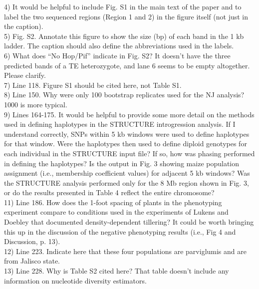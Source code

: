 \documentclass[]{article}
\begin{document}
4) It would be helpful to include Fig. S1 in the main text of the paper and to label the two sequenced regions (Region 1 and 2) in the figure itself (not just in the caption). \\

5) Fig. S2. Annotate this figure to show the size (bp) of each band in the 1 kb ladder. The caption should also define the abbreviations used in the labels. \\

6) What does “No Hop/Pif” indicate in Fig. S2? It doesn’t have the three predicted bands of a TE heterozygote, and lane 6 seems to be empty altogether. Please clarify. \\

7) Line 118. Figure S1 should be cited here, not Table S1. \\

8) Line 150. Why were only 100 bootstrap replicates used for the NJ analysis? 1000 is more typical.\\

9) Lines 164-175. It would be helpful to provide some more detail on the methods used in defining haplotypes in the STRUCTURE introgression analysis. If I understand correctly, SNPs within 5 kb windows were used to define haplotypes for that window. Were the haplotypes then used to define diploid genotypes for each individual in the STRUCTURE input file? If so, how was phasing performed in defining the haplotypes? Is the output in Fig. 3 showing maize population assignment (i.e., membership coefficient values) for adjacent 5 kb windows? Was the STRUCTURE analysis performed only for the 8 Mb region shown in Fig. 3, or do the results presented in Table 4 reflect the entire chromosome? \\

11) Line 186. How does the 1-foot spacing of plants in the phenotyping experiment compare to conditions used in the experiments of Lukens and Doebley that documented density-dependent tillering? It could be worth bringing this up in the discussion of the negative phenotyping results (i.e., Fig 4 and Discussion, p. 13). \\

12) Line 223. Indicate here that these four populations are parviglumis and are from Jalisco state. \\

13) Line 228. Why is Table S2 cited here? That table doesn’t include any information on nucleotide diversity estimators.\\
\end{document}
